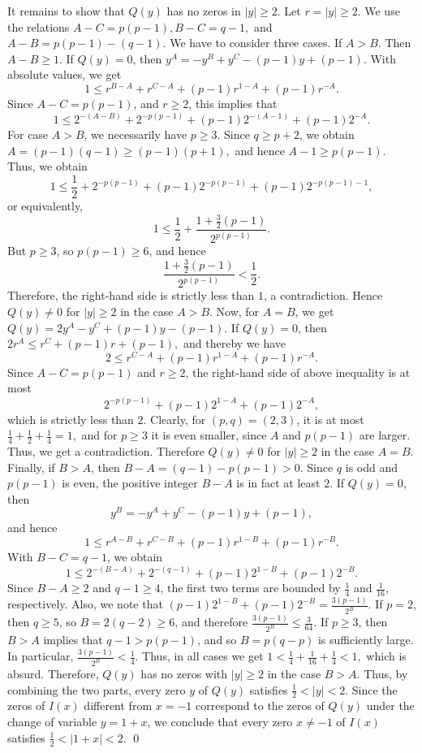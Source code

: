 \documentclass[10pt,a4paper]{amsart}
\renewenvironment{proof}{{\noindent\bfseries Proof.}}{\qed}
\begin{document}
\begin{proof}
	It remains to show that $Q(y)$ has no zeros in $|y|\geq 2$. Let $r=|y|\geq 2$. We use the relations
	$
	A-C=p(p-1), 
	B-C=q-1,
	$
	and
	$
	A-B=p(p-1)-(q-1).
	$
	We have to consider three cases. If $A>B$. Then $A-B\geq 1$. If $Q(y)=0$, then
	$
	y^A=-y^B+y^C-(p-1)y+(p-1).
	$
	With absolute values, we get
	$$
	1
	\leq
	r^{B-A}+r^{C-A}+(p-1)r^{1-A}+(p-1)r^{-A}.
	$$
	Since $A-C=p(p-1)$, and $r\geq 2$, this implies that
	$$
	1
	\leq
	2^{-(A-B)}
	+
	2^{-p(p-1)}
	+
	(p-1)2^{-(A-1)}
	+
	(p-1)2^{-A}.
	$$
	For case $A>B$, we necessarily have $p\geq 3$. Since $q\geq p+2$, we obtain
	$
	A=(p-1)(q-1)\geq (p-1)(p+1),
	$
	and hence $A-1\geq p(p-1)$. Thus, we obtain
	$$
	1
	\leq
	\frac12
	+
	2^{-p(p-1)}
	+
	(p-1)2^{-p(p-1)}
	+
	(p-1)2^{-p(p-1)-1},
	$$
	or equivalently,
	$$
	1
	\leq
	\frac12+
	\frac{1+\frac32(p-1)}{2^{p(p-1)}}.
	$$
	But $p\geq 3$, so $p(p-1)\geq 6$, and hence
	$$
	\frac{1+\frac32(p-1)}{2^{p(p-1)}}<\frac12.
	$$
	Therefore, the right-hand side is strictly less than $1$, a contradiction. Hence $Q(y)\neq 0$ for $|y|\geq 2$ in the case $A>B$.
	 Now, for $A=B$, we get 
	$
	Q(y)=2y^A-y^C+(p-1)y-(p-1).
	$
	If $Q(y)=0$, then
	$
	2r^A\leq r^C+(p-1)r+(p-1), 
	$ and thereby we have
	$$
	2\leq r^{C-A}+(p-1)r^{1-A}+(p-1)r^{-A}.
	$$
	Since $A-C=p(p-1)$ and $r\geq 2$, the right-hand side of above inequality  is at most
	$$
	2^{-p(p-1)}+(p-1)2^{1-A}+(p-1)2^{-A},
	$$
	which is strictly less than $2$. Clearly, for $(p,q)=(2,3)$, it is at most
	$
	\frac14+\frac12+\frac14=1,
	$
	and for $p\geq 3$ it is even smaller, since $A$ and $p(p-1)$ are larger. Thus, we get a contradiction. Therefore $Q(y)\neq 0$ for $|y|\geq 2$ in the case $A=B$. Finally, if $B>A$, then
	$
	B-A=(q-1)-p(p-1)>0.
	$
	Since $q$ is odd and $p(p-1)$ is even, the positive integer $B-A$ is in fact at least $2$. If $Q(y)=0$, then
	$$
	y^B=-y^A+y^C-(p-1)y+(p-1),
	$$
	and hence
	$$
	1
	\leq
	r^{A-B}+r^{C-B}+(p-1)r^{1-B}+(p-1)r^{-B}.
	$$
	With $B-C=q-1$, we obtain
	$$
	1
	\leq
	2^{-(B-A)}
	+
	2^{-(q-1)}
	+
	(p-1)2^{1-B}
	+
	(p-1)2^{-B}.
	$$
	Since $B-A\geq 2$ and $q-1\geq 4$, the first two terms are bounded by $\tfrac14$ and $\tfrac1{16}$, respectively. Also, we note that 
	$
	(p-1)2^{1-B}+(p-1)2^{-B}
	=
	\tfrac{3(p-1)}{2^B}.
	$
	If $p=2$, then $q\geq 5$, so $B=2(q-2)\geq 6$, and therefore
	$
	\tfrac{3(p-1)}{2^B}\leq \tfrac{3}{64}.
	$
	If $p\geq 3$, then $B>A$ implies that $q-1>p(p-1)$, and so $B=p(q-p)$ is sufficiently large. In particular,
	$
	\tfrac{3(p-1)}{2^B}<\tfrac14.
	$
	Thus,  in all cases we get
	$
	1
	<
	\tfrac14+\tfrac1{16}+\tfrac14
	<1,
	$
	which is absurd. Therefore, $Q(y)$ has no zeros with $|y|\geq 2$ in the case $B>A$.
	Thus, by combining the two parts, every zero $y$ of $Q(y)$ satisfies
	$
	\tfrac12<|y|<2.
	$
	Since the zeros of $I(x)$ different from $x=-1$ correspond to the zeros of $Q(y)$ under the change of variable $y=1+x$, we conclude that every zero $x\neq -1$ of $I(x)$ satisfies
	$
	\tfrac12<|1+x|<2.
	$
\end{proof} 
\end{document}
